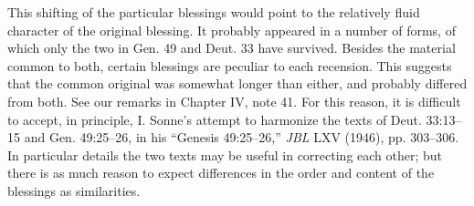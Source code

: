{{		This shifting of the particular blessings would point to the relatively fluid
		character of the original blessing. It probably appeared in a number of forms,
		of which only the two in Gen. 49 and Deut. 33 have survived. Besides the
		material common to both, certain blessings are peculiar to each recension. This
		suggests that the common original was somewhat longer than either, and probably
		differed from both. See our remarks in Chapter IV, note 41. For this reason, it
		is difficult to accept, in principle, I. Sonne's attempt to harmonize the texts
		of Deut. 33:13--15 and Gen. 49:25--26, in his ``Genesis 49:25--26,'' \emph{JBL}
		LXV (1946), pp. 303--306. In particular details the two texts may be useful in
		correcting each other; but there is as much reason to expect differences in the
		order and content of the blessings as similarities.
	}
}

